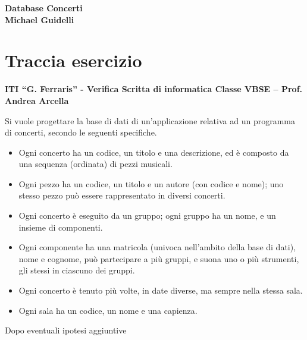 \documentclass[12pt]{article}
\date{}
\begin{document}

\maketitle
\null \null \null \null \null \null
{\centering
    \huge\bfseries Database Concerti \\
    \Large\normalfont Michael Guidelli  \\
}

\clearpage


\section*{Traccia esercizio}

\noindent
\textbf{ITI “G. Ferraris” - Verifica Scritta di informatica Classe VBSE – Prof. Andrea Arcella} \newline

\noindent
Si vuole progettare la base di dati di un’applicazione relativa ad un programma di concerti,
secondo le seguenti specifiche.

\begin{itemize}
    \item Ogni concerto ha un codice, un titolo e una descrizione, ed è composto da una sequenza (ordinata) di pezzi musicali.
    
    \item Ogni pezzo ha un codice, un titolo e un autore (con codice e nome); uno stesso pezzo può essere rappresentato in diversi concerti.
    
    \item Ogni concerto è eseguito da un gruppo; ogni gruppo ha un nome, e un insieme di componenti.
    
    \item Ogni componente ha una matricola (univoca nell’ambito della base di dati), nome e cognome, può partecipare a più gruppi, e suona uno o più strumenti, gli stessi in ciascuno dei gruppi.
    
    \item Ogni concerto è tenuto più volte, in date diverse, ma sempre nella stessa sala.
    
    \item Ogni sala ha un codice, un nome e una capienza.
\end{itemize}

\noindent
Dopo eventuali ipotesi aggiuntive
\end{document}
